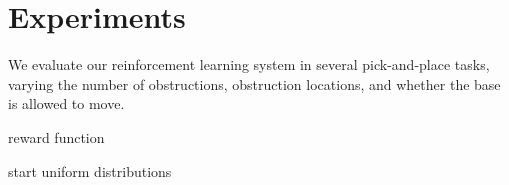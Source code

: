 \section{Experiments}
We evaluate our reinforcement learning system in several
pick-and-place tasks, varying the number of obstructions,
obstruction locations, and whether the base is allowed to
move.

reward function

start uniform distributions